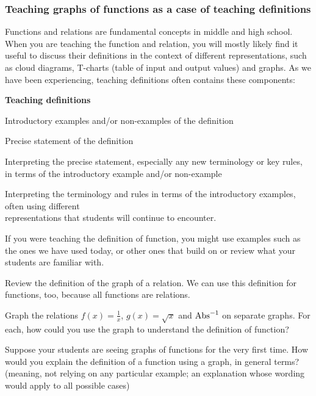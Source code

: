 \documentclass[11pt]{article}
\newenvironment{task}
	{\begin{mdframed}[linecolor=lightgray, linewidth=3pt]\raggedright}
	{\end{mdframed}}
\newcommand\tn{\textnormal}
\theoremstyle{definition}
\begin{document}
\vspace*{-12pt}
\subsubsection{Teaching graphs of functions as a case of teaching definitions}
\label{s: teaching definitions}

Functions and relations are fundamental concepts in middle and high school. When you are teaching the function and relation, you will mostly likely find it useful to discuss their definitions in the context of different representations, such as cloud diagrams, T-charts (table of input and output values) and graphs.  As we have been experiencing, teaching definitions often contains these components:

\begin{mdframed}
\begin{center}
{\bf Teaching definitions}
\end{center}
\vspace*{-4pt}
	\begin{itemize*}
	\item Introductory examples and/or non-examples of the definition
	\item Precise statement of the definition
	\item Interpreting the precise statement, especially any new terminology or key rules, in terms of the introductory example and/or non-example
	\item Interpreting the terminology and rules in terms of the introductory examples, often using different \\ representations that students will continue to encounter.
	\end{itemize*}
\end{mdframed}

If you were teaching the definition of function, you might use examples such as the ones we have used today, or other ones that build on or review what your students are familiar with.

\begin{task}
Review the definition of the graph of a relation. We can use this definition for functions, too, because all functions are relations.

Graph the relations $f(x)=\frac{1}{x}$, $g(x)=\sqrt{x}$ and $\tn{Abs}^{-1}$ on separate graphs. For each, how could you use the graph to understand the definition of function?

Suppose your students are seeing graphs of functions for the very first time. How would you explain the definition of a function using a graph, in general terms? (meaning, not relying on any particular example; an explanation whose wording would apply to all possible cases)
\end{task}
\end{document}
